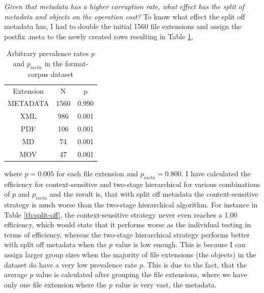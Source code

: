 \textit{Given that metadata has a higher corruption rate, what effect has the split of metadata and objects on the operation cost?}
To know what effect the split off metadata has, I had to double the initial 1560 file extensions and assign the postfix .meta to the newly created rows resulting in Table \ref{tb:metadata},
\begin{table}[H]
    \caption{Arbitrary prevalence rates $p$ and $p_{meta}$ in the format-corpus dataset}
    \centering
    \begin{tabular}{c c c}
    \label{tb:metadata}
    Extension & N & p\\
    METADATA & 1560 & 0.990 \\
    XML& 986 & 0.001 \\
    PDF& 106 & 0.001 \\
    MD& 74 & 0.001 \\
    MOV& 47 & 0.001 
    \end{tabular}
\end{table}
where $p=0.005$ for each file extension and $p_{meta}=0.800$. 
I have calculated the efficiency for context-sensitive and two-stage hierarchical for various combinations of $p$ and $p_{meta}$ and the result is, that with split off metadata the context-sensitive strategy is much worse than the two-stage hierarchical algorithm.
For instance in Table \ref{tb:split-off}, the context-sensitive strategy never even reaches a 1.00 efficiency, which would state that it performs worse as the individual testing in terms of efficiency, whereas the two-stage hierarchical strategy performs better with split off metadata when the $p$ value is low enough. This is because I can assign larger group sizes when the majority of file extensions (the objects) in the dataset do have a very low prevalence rate $p$. This is due to the fact, that the average $p$ value is calculated after grouping the file extensions, where we have only one file extension where the $p$ value is very vast, the metadata.
